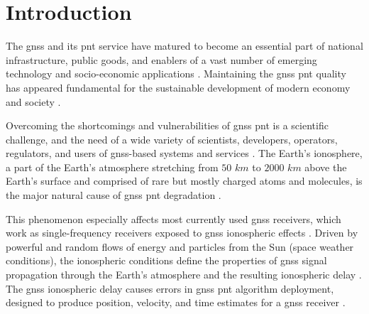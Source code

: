 \documentclass[sn-mathphys-num]{sn-jnl}%
\begin{document}



\maketitle

\section{Introduction}

The \acrfull{gnss} and its \acrfull{pnt} service have matured to become an essential part of national infrastructure, public goods, and enablers of a vast number of emerging technology and socio-economic applications \cite{filjar2022application}. Maintaining the \acrshort{gnss} \acrshort{pnt} quality has appeared fundamental for the sustainable development of modern economy and society \cite{filjar2022application}. 

Overcoming the shortcomings and vulnerabilities of \acrshort{gnss} \acrshort{pnt} is a scientific challenge, and the need of a wide variety of scientists, developers, operators, regulators, and users of \acrshort{gnss}-based systems and services \cite{filjar2024ambient, filjar2022application}. The Earth’s ionosphere, a part of the Earth’s atmosphere stretching from $50$ $km$ to $2000$ $km$ above the Earth’s surface and comprised of rare but mostly charged atoms and molecules, is the major natural cause of \acrshort{gnss} \acrshort{pnt} degradation \cite{davies1990ionospheric, filic2018modelling}.

This phenomenon especially affects most currently used \acrshort{gnss} receivers, which work as single-frequency receivers exposed to \acrshort{gnss} ionospheric effects \cite{spilker1996global, filjar2022application}. Driven by powerful and random flows of energy and particles from the Sun (space weather conditions), the ionospheric conditions define the properties of \acrshort{gnss} signal propagation through the Earth’s atmosphere and the resulting ionospheric delay \cite{davies1990ionospheric, oxley2017uncertainties, filic2018modelling}. The \acrshort{gnss} ionospheric delay causes errors in \acrshort{gnss} \acrshort{pnt} algorithm deployment, designed to produce position, velocity, and time estimates for a \acrshort{gnss} receiver \cite{spilker1996global, filic2018modelling}. 
\end{document}
